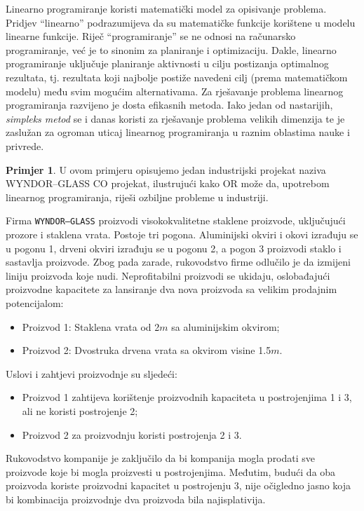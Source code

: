 \documentclass[a4paper, utf8, 11pt, colorlinks]{book}
\theoremstyle{definition}
\newtheorem{primjer}{Primjer}[chapter]
\begin{document}
Linearno programiranje koristi matematički model za opisivanje problema. Pridjev ``linearno'' podrazumijeva da su  matematičke funkcije korištene u modelu linearne funkcije. Riječ ``programiranje'' se ne odnosi na računarsko programiranje, već je to sinonim za planiranje i optimizaciju. Dakle, linearno programiranje uključuje planiranje aktivnosti u cilju postizanja optimalnog rezultata, tj. rezultata koji najbolje postiže navedeni cilj (prema matematičkom modelu) među svim mogućim alternativama.  Za rješavanje problema linearnog programiranja razvijeno je dosta efikasnih metoda. Iako jedan od nastarijih,  \emph{simpleks metod} se i danas koristi za rješavanje problema velikih dimenzija te je zaslužan za ogroman uticaj linearnog  programiranja u raznim oblastima nauke i privrede.

\begin{primjer}\label{primjer:graficki} U ovom primjeru opisujemo jedan industrijski projekat 
naziva {WYNDOR--GLASS CO projekat}, ilustrujući kako OR  može da, upotrebom linearnog programiranja, riješi ozbiljne probleme u industriji.
 \end{primjer}
Firma \texttt{WYNDOR--GLASS} proizvodi visokokvalitetne staklene proizvode, uključujući prozore i staklena vrata. Postoje tri pogona. Aluminijski okviri i okovi izrađuju se u pogonu 1, drveni okviri izrađuju se u pogonu 2, a pogon 3 proizvodi staklo i sastavlja proizvode.
Zbog pada zarade, rukovodstvo firme   odlučilo je da izmijeni liniju proizvoda koje nudi. Neprofitabilni proizvodi se ukidaju, oslobađajući proizvodne kapacitete za lansiranje dva nova proizvoda sa velikim prodajnim potencijalom:
\begin{itemize}
    \item Proizvod 1: Staklena vrata od 2$m$ sa aluminijskim okvirom;
    \item Proizvod 2: Dvostruka drvena vrata sa okvirom visine 1.5$m$.
\end{itemize}
Uslovi i zahtjevi proizvodnje su sljedeći:
\begin{itemize}
    \item Proizvod 1 zahtijeva   korištenje proizvodnih kapaciteta u postrojenjima 1 i 3, ali ne koristi postrojenje 2; 
    \item Proizvod 2 za proizvodnju koristi   postrojenja 2 i 3. 
\end{itemize}
    Rukovodstvo kompanije je zaključilo da bi kompanija mogla prodati sve proizvode koje bi mogla proizvesti u postrojenjima. Međutim, budući da   oba proizvoda koriste proizvodni kapacitet u postrojenju 3, nije očigledno jasno koja bi kombinacija proizvodnje dva proizvoda bila najisplativija. %
\end{document}
